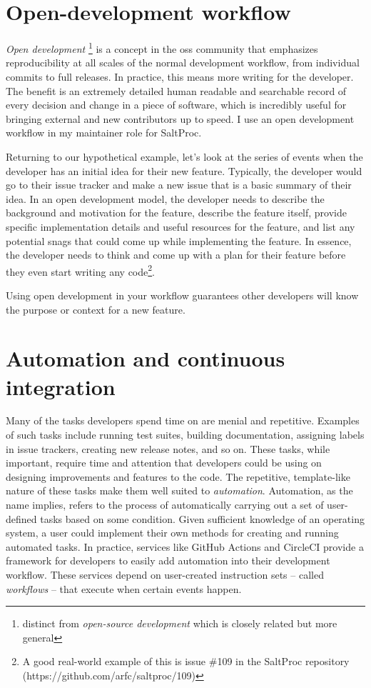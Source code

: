 \documentclass{anstrans}
\begin{document}
\section{Open-development workflow}

    {\it Open development} \footnote{distinct from {\it open-source development} which is closely related but more general}  is a concept in the \Gls{oss} community that emphasizes reproducibility at all scales of the normal development workflow, from individual commits to full releases. In practice, this means more writing for the developer. The benefit is an extremely detailed human readable and searchable record of every decision and change in a piece of software, which is incredibly useful for bringing external and new contributors up to speed. I use an open development workflow in my maintainer role for SaltProc.
    
    Returning to our hypothetical example, let's look at the series of events when the developer has an initial idea for their new feature. Typically, the developer would go to their issue tracker and make a new issue that is a basic summary of their idea. In an open development model, the developer needs to describe the background and motivation for the feature, describe the feature itself, provide specific implementation details and useful resources for the feature, and list any potential snags that could come up while implementing the feature. In essence, the developer needs to think and come up with a plan for their feature before they even start writing any code\footnote{A good real-world example of this is issue \#109 in the SaltProc repository (https://github.com/arfc/saltproc/109)}.
    
    Using open development in your workflow guarantees other developers will know the purpose or context for a new feature.
    
\section{Automation and continuous integration}
    Many of the tasks developers spend time on are menial and repetitive. Examples of such tasks include running test suites, building documentation, assigning labels in issue trackers, creating new release notes, and so on. These tasks, while important, require time and attention that developers could be using on designing improvements and features to the code. The repetitive, template-like nature of these tasks make them well suited to {\it automation}. Automation, as the name implies, refers to the process of automatically carrying out a set of user-defined tasks based on some condition. Given sufficient knowledge of an operating system, a user could implement their own methods for creating and running automated tasks. In practice, services like GitHub Actions and CircleCI provide a framework for developers to easily add automation into their development workflow. These services depend on user-created instruction sets -- called {\it workflows} -- that execute when certain events happen.
\end{document}
